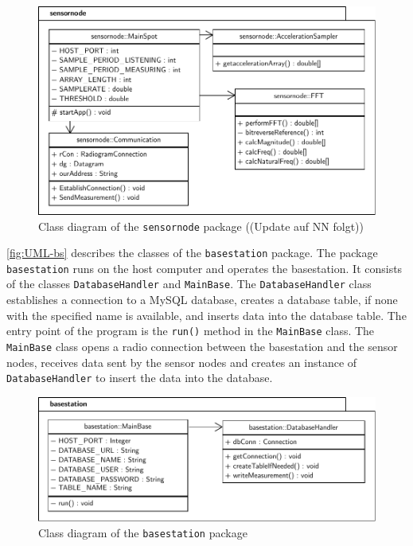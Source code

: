 \documentclass[12pt,a4paper]{scrartcl}
\begin{document}
\begin{figure}[htbp]
    \centering
    \includegraphics[width = \textwidth]{figures/uml-sensornode.pdf}
    \caption{Class diagram of the \texttt{sensornode} package ((Update auf NN folgt))}
    \label{fig:UML-sn}
\end{figure}

\autoref{fig:UML-bs} describes the classes of the \texttt{base\-station} package.
The package \texttt{base\-station} runs on the host computer and operates the basestation.
It consists of the classes \texttt{Database\-Handler} and \texttt{Main\-Base}.
The \texttt{Database\-Handler} class establishes a connection to a MySQL database, creates a database table, if none with the specified name is available, and inserts data into the database table.
The entry point of the program is the \texttt{run()} method in the \texttt{Main\-Base} class. The \texttt{Main\-Base} class opens a radio connection between the basestation and the sensor nodes, receives data sent by the sensor nodes and creates an instance of \texttt{Database\-Handler} to insert the data into the database.

\begin{figure}[htbp]
    \centering
    \includegraphics[width = \textwidth]{figures/uml-basestation.pdf}
    \caption{Class diagram of the \texttt{basestation} package}
    \label{fig:UML-bs}
\end{figure}
\end{document}
